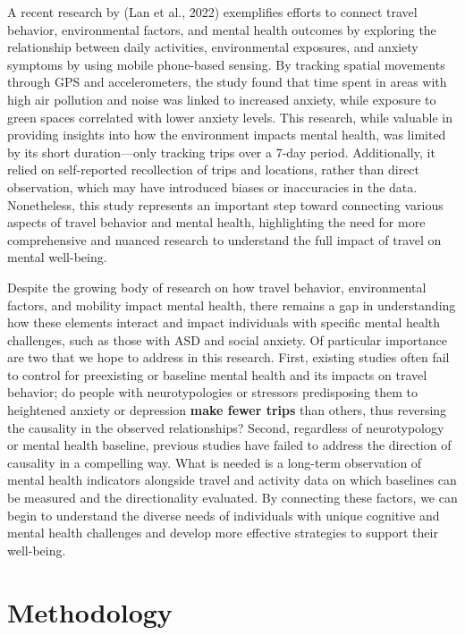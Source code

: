 \documentclass[
  letterpaper,
  number,
  review,
  3p]{elsarticle}
\begin{document}
A recent research by (Lan et al., 2022) exemplifies efforts to connect
travel behavior, environmental factors, and mental health outcomes by
exploring the relationship between daily activities, environmental
exposures, and anxiety symptoms by using mobile phone-based sensing. By
tracking spatial movements through GPS and accelerometers, the study
found that time spent in areas with high air pollution and noise was
linked to increased anxiety, while exposure to green spaces correlated
with lower anxiety levels. This research, while valuable in providing
insights into how the environment impacts mental health, was limited by
its short duration---only tracking trips over a 7-day period.
Additionally, it relied on self-reported recollection of trips and
locations, rather than direct observation, which may have introduced
biases or inaccuracies in the data. Nonetheless, this study represents
an important step toward connecting various aspects of travel behavior
and mental health, highlighting the need for more comprehensive and
nuanced research to understand the full impact of travel on mental
well-being.

Despite the growing body of research on how travel behavior,
environmental factors, and mobility impact mental health, there remains
a gap in understanding how these elements interact and impact
individuals with specific mental health challenges, such as those with
ASD and social anxiety. Of particular importance are two that we hope to
address in this research. First, existing studies often fail to control
for preexisting or baseline mental health and its impacts on travel
behavior; do people with neurotypologies or stressors predisposing them
to heightened anxiety or depression \textbf{make fewer trips} than
others, thus reversing the causality in the observed relationships?
Second, regardless of neurotypology or mental health baseline, previous
studies have failed to address the direction of causality in a
compelling way. What is needed is a long-term observation of mental
health indicators alongside travel and activity data on which baselines
can be measured and the directionality evaluated. By connecting these
factors, we can begin to understand the diverse needs of individuals
with unique cognitive and mental health challenges and develop more
effective strategies to support their well-being.


\section{Methodology}\label{sec-methods}
\end{document}
